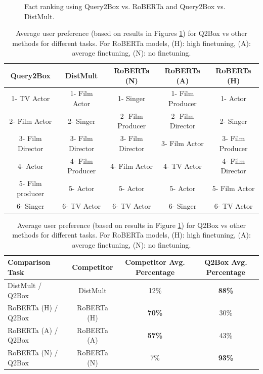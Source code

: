 \begin{figure}[!t]
\begin{minipage}{0.86\textwidth}
\begin{tabular}{@{}c@{}c@{}}
\end{tabular}
\vspace{-3mm}
\caption{Fact ranking using Query2Box vs. RoBERTa and Query2Box vs. DistMult.
\label{fig:q2b_roberta_distmult}}
\end{minipage}
\end{figure}







\begin{table}[t]
\caption{Average user preference (based on results in Figures \ref{fig:q2b_roberta_distmult}) for Q2Box vs other methods for different tasks. For RoBERTa models, (H): high finetuning, (A): average finetuning, (N): no finetuning.\label{tab:jen_ranking}}
\begin{tabular}{ccccc}
\textbf{Query2Box} & \textbf{DistMult} & \textbf{RoBERTa (N)} & \textbf{RoBERTa (A)}      & \textbf{RoBERTa (H)}      \\
\hline
1- TV Actor        & 1- Film Actor     & 1- Singer            & 1- Film Producer & 1- Actor         \\
2- Film Actor      & 2- Singer         & 2- Film Producer     & 2- Film Director & 2- Singer        \\
3- Film Director   & 3- Film Director  & 3- Film Director     & 3- Film Actor    & 3- Film Producer \\
4- Actor           & 4- Film Producer  & 4- Film Actor        & 4- TV Actor      & 4- Film Director \\
5- Film producer   & 5- Actor          & 5- Actor             & 5- Actor         & 5- Film Actor    \\
6- Singer          & 6- TV Actor       & 6- TV Actor          & 6- Singer        & 6- TV Actor     
\end{tabular}
\end{table}

\begin{table}[t]
\centering
\caption{Average user preference (based on results in Figure \ref{fig:q2b_roberta_distmult}) for Q2Box vs other methods for different tasks. For RoBERTa models, (H): high finetuning, (A): average finetuning, (N): no finetuning.}
\label{tab:avg_ranking}
\small
\begin{tabular}{@{}lccc@{}}
\textbf{Comparison Task} & \textbf{Competitor} & \textbf{Competitor Avg. Percentage} & \textbf{Q2Box Avg. Percentage} \\
\hline
DistMult / Q2Box         & DistMult            & 12\%                     & \textbf{88\%} \\
RoBERTa (H) / Q2Box      & RoBERTa (H)         & \textbf{70\%}            & 30\%          \\
RoBERTa (A) / Q2Box      & RoBERTa (A)         & \textbf{57\%}            & 43\%          \\
RoBERTa (N) / Q2Box      & RoBERTa (N)         & 7\%            & \textbf{93\%}          \\
\end{tabular}
\end{table}



